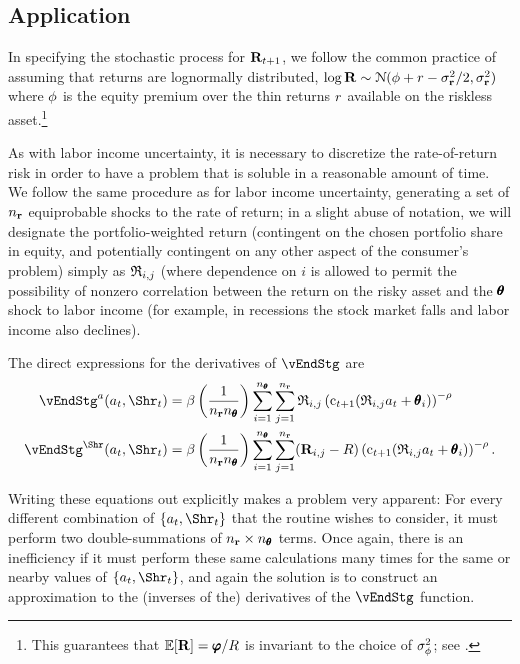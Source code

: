 \documentclass[\econtexRoot/SolvingMicroDSOPs]{subfiles}
\begin{document}
\subsection{Application}\label{subsec:MCApplication}


In specifying the stochastic process for ${\mathbf{R}}_{t+1}$, we follow the common practice of assuming that returns are lognormally distributed, $\log {\mathbf{R}} \sim \mathcal{N}(\phi+r-\sigma^{2}_{{\mathbf{r}}}/2,\sigma^{2}_{{\mathbf{r}}})$ where $\phi$ is the equity premium over the thin returns $r$ available on the riskless asset.\footnote{This guarantees that $\operatorname{\mathbb{E}}[{\mathbf{R}}] = \pmb{\varphi}/R$ is invariant to the choice of $\sigma^{2}_{\phi}$; see .}

As with labor income uncertainty, it is necessary to discretize the rate-of-return risk in order to have a problem that is soluble in a reasonable amount of time.  We follow the same procedure as for labor income uncertainty, generating a set of $n_{{\mathbf{r}}}$ equiprobable shocks to the rate of return; in a slight abuse of notation, we will designate the portfolio-weighted return (contingent on the chosen portfolio share in equity, and potentially contingent on any other aspect of the consumer's problem) simply as $\mathfrak{R}_{i,j}$ (where dependence on $i$ is allowed to permit the possibility of nonzero correlation between the return on the risky asset and the $\pmb{\theta}$ shock to labor income (for example, in recessions the stock market falls and labor income also declines).

The direct expressions for the derivatives of $\vEndStg$ are
\begin{equation}\begin{gathered}\begin{aligned}
      \vEndStg^{a}(a_{\prd},\Shr_{\prd})  & = \DiscFac \left(\frac{1}{n_{\risky} n_{\TranShkEmp}}\right)\sum_{i=1}^{n_{\TranShkEmp}}\sum_{j=1}^{n_{\risky} }\Rport_{i,j} \left(\cFunc_{\prd+1}(\Rport_{i,j}a_{\prd}+\TranShkEmp_{i})\right)^{-\CRRA}
      \\      \vEndStg^{\Shr}(a_{\prd},\Shr_{\prd})  & = \DiscFac \left(\frac{1}{n_{\risky} n_{\TranShkEmp}}\right)\sum_{i=1}^{n_{\TranShkEmp}}\sum_{j=1}^{n_{\risky} }(\Risky_{i,j}-\Rfree)\left(\cFunc_{\prd+1}(\Rport_{i,j}a_{\prd}+\TranShkEmp_{i})\right)^{-\CRRA}.
    \end{aligned}\end{gathered}\end{equation}

Writing these equations out explicitly makes a problem very apparent: For every different combination of $\{{a}_{\prd},\Shr_{\prd}\}$ that the routine wishes to consider, it must perform two double-summations of $n_{{\mathbf{r}}} \times n_{\pmb{\theta}}$ terms.  Once again, there is an inefficiency if it must perform these same calculations many times for the same or nearby values of $\{{a}_{\prd},\Shr_{\prd}\}$, and again the solution is to construct an approximation to the (inverses of the) derivatives of the $\vEndStg$ function.
\end{document}
